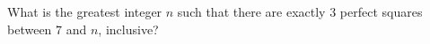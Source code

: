 What is the greatest integer $n$ such that there are exactly $3$ perfect squares between $7$ and $n$, inclusive?
